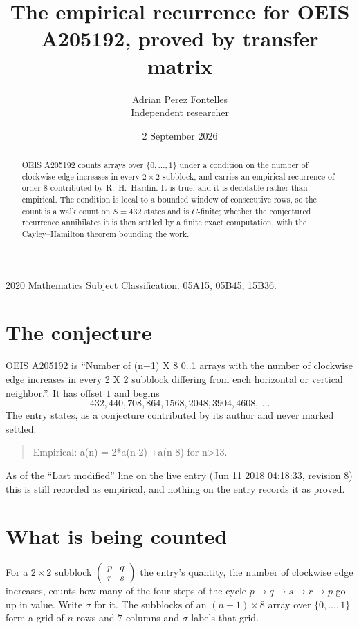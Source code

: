 \documentclass[11pt,a4paper]{article}
\title{The empirical recurrence for OEIS A205192, proved by transfer matrix}
\author{Adrian Perez Fontelles\\ \small Independent researcher}
\date{2 September 2026}
\theoremstyle{plain}
\theoremstyle{definition}
\begin{document}
\maketitle

\begin{abstract}
OEIS A205192 counts arrays over $\{0,\dots,1\}$ under a condition on the number of clockwise edge increases
in every $2\times2$ subblock, and carries an empirical recurrence of order $8$ contributed by
R.~H.~Hardin. It is true, and it is decidable rather than empirical. The condition is local to
a bounded window of consecutive rows, so the count is a walk count on $S=432$ states and is
$C$-finite; whether the conjectured recurrence annihilates it is then settled by a finite exact
computation, with the Cayley--Hamilton theorem bounding the work.
\end{abstract}

\noindent\small 2020 Mathematics Subject Classification. 05A15, 05B45, 15B36.\normalsize

\section{The conjecture}

OEIS A205192 is ``Number of (n+1) X 8 0..1 arrays with the number of clockwise edge increases in every 2 X 2 subblock differing from each horizontal or vertical neighbor.''. It has offset $1$ and begins
\[
432, 440, 708, 864, 1568, 2048, 3904, 4608,\ \dots
\]
The entry states, as a conjecture contributed by its author and never marked settled:
\begin{quote}
Empirical: a(n) = 2*a(n-2) +a(n-8) for n>13.
\end{quote}
As of the ``Last modified'' line on the live entry (Jun 11 2018 04:18:33, revision 8) this is still
recorded as empirical, and nothing on the entry records it as proved.

\section{What is being counted}

For a $2\times2$ subblock $\begin{pmatrix}p&q\\r&s\end{pmatrix}$ the
entry's quantity, the number of clockwise edge increases, counts how many of the four steps of the cycle $p\to q\to s\to r\to p$ go up in value. Write $\sigma$ for it. The subblocks of an
$(n+1)\times8$ array over $\{0,\dots,1\}$ form a grid of $n$ rows and $7$
columns and $\sigma$ labels that grid.
\end{document}
